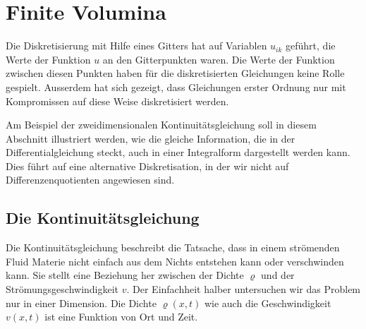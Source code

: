 %
%
%
\section{Finite Volumina
\label{section:finite-volumina}}
%
Die Diskretisierung mit Hilfe eines Gitters hat auf Variablen $u_{ik}$
geführt, die Werte der Funktion $u$ an den Gitterpunkten waren.
%
Die Werte der Funktion zwischen diesen Punkten haben für die
diskretisierten Gleichungen keine Rolle gespielt.
Ausserdem hat sich gezeigt, dass Gleichungen erster Ordnung
nur mit Kompromissen auf diese Weise diskretisiert werden.

Am Beispiel der zweidimensionalen Kontinuitätsgleichung soll
in diesem Abschnitt illustriert werden, wie die gleiche Information,
die in der Differentialgleichung steckt, auch in einer Integralform
dargestellt werden kann.
%
Dies führt auf eine alternative Diskretisation, in der wir nicht
auf Differenzenquotienten angewiesen sind.
%

\subsection{Die Kontinuitätsgleichung}
Die Kontinuitätsgleichung beschreibt die Tatsache, dass in einem
strömenden Fluid Materie nicht einfach aus dem Nichts entstehen kann
oder verschwinden kann.
%
%
Sie stellt eine Beziehung her zwischen der Dichte $\varrho$ und der
Strömungsgeschwindigkeit $v$.
%
Der Einfachheit halber untersuchen wir das Problem nur in einer
Dimension.
Die Dichte $\varrho(x,t)$ wie auch die Geschwindigkeit $v(x,t)$
ist eine Funktion von Ort und Zeit.
%

